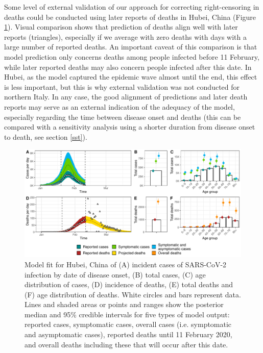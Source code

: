 \documentclass{article}
\begin{document}
Some level of external validation of our approach for correcting right-censoring in deaths could be conducted using later reports of deaths in Hubei, China (Figure \ref{fig:mortality}).
Visual comparison shows that prediction of deaths align well with later reports (triangles), especially if we average with zero deaths with days with a large number of reported deaths.
An important caveat of this comparison is that model prediction only concerns deaths among people infected before 11 February, while later reported deaths may also concern people infected after this date.
In Hubei, as the model captured the epidemic wave almost until the end, this effect is less important, but this is why external validation was not conducted for northern Italy.
In any case, the good alignment of predictions and later death reports may serve as an external indication of the adequacy of the model, especially regarding the time between disease onset and deaths (this can be compared with a sensitivity analysis using a shorter duration from disease onset to death, see section \ref{sst}).

\begin{figure}[H]
	\includegraphics[width=\linewidth]{../format_output/figures/modelfit_china_bis.pdf}
\caption{Model fit for Hubei, China of (A) incident cases of SARS-CoV-2 infection by date of disease onset, (B) total cases, (C) age distribution of cases, (D) incidence of deaths, (E) total deaths and (F) age distribution of deaths. White circles and bars represent data. Lines and shaded areas or points and ranges show the posterior median and 95\% credible intervals for five types of model output: reported cases, symptomatic cases, overall cases (i.e. symptomatic and asymptomatic cases), reported deaths until 11 February 2020, and overall deaths including these that will occur after this date.}
	\label{fig:mortality}
\end{figure}
	
\end{document}
